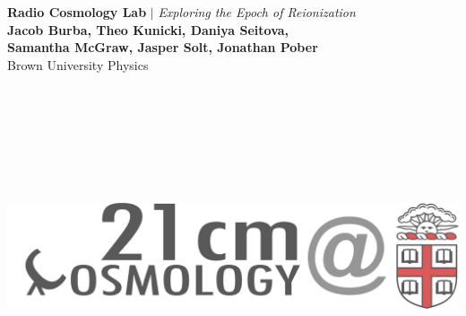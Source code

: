 \documentclass[a0,landscape]{a0poster}
\begin{document}


\begin{minipage}[b]{0.45\textwidth}
\veryHuge \color{Brown} \textbf{Radio Cosmology Lab} \color{Black}\textbf{$|$} \color{Black}\LARGE\textit{Exploring the Epoch of Reionization}\\
\textbf{Jacob Burba, Theo Kunicki, Daniya Seitova, \\Samantha McGraw, Jasper Solt, Jonathan Pober}\\ %
\huge Brown University Physics\\ %
\end{minipage}
\hfill
\begin{minipage}[b]{0.45\textwidth}
\includegraphics[width=50cm, height=10cm]{radiologo_update.png} %
\end{minipage}
\vspace*{10pt}

\end{document}

